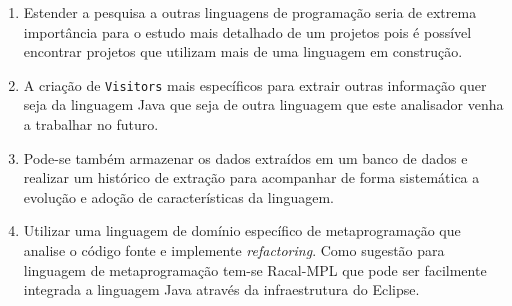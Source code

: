 \begin{enumerate}
	\item Estender a pesquisa a outras linguagens de programação seria de extrema importância para o estudo mais detalhado de um projetos pois é possível encontrar projetos que utilizam mais de uma linguagem em construção.

	\item A criação de \texttt{Visitors} mais específicos para extrair outras informação quer seja da linguagem Java que seja de outra linguagem que este analisador venha a trabalhar no futuro.

	\item Pode-se também armazenar os dados extraídos em um banco de dados e realizar um histórico de extração para acompanhar de forma sistemática a evolução e adoção de características da linguagem.

	\item Utilizar uma linguagem de domínio específico de metaprogramação que analise o código fonte e implemente \textit{refactoring}. Como sugestão para linguagem de metaprogramação tem-se Racal-MPL que pode ser facilmente integrada a linguagem Java através da infraestrutura do Eclipse.

\end{enumerate}






